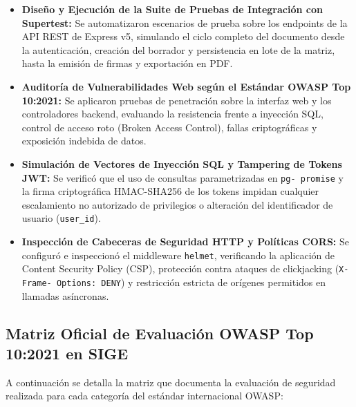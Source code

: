 \documentclass[12pt,a4paper]{article}
\begin{document}
\begin{itemize}[leftmargin=1.5em, itemsep=4pt]
    \item \textbf{Diseño y Ejecución de la Suite de Pruebas de Integración con Supertest:} Se automatizaron escenarios de prueba sobre los endpoints de la API REST de Express v5, simulando el ciclo completo del documento desde la autenticación, creación del borrador y persistencia en lote de la matriz, hasta la emisión de firmas y exportación en PDF.
    \item \textbf{Auditoría de Vulnerabilidades Web según el Estándar OWASP Top 10:2021:} Se aplicaron pruebas de penetración sobre la interfaz web y los controladores backend, evaluando la resistencia frente a inyección SQL, control de acceso roto (Broken Access Control), fallas criptográficas y exposición indebida de datos.
    \item \textbf{Simulación de Vectores de Inyección SQL y Tampering de Tokens JWT:} Se verificó que el uso de consultas parametrizadas en \texttt{pg- promise} y la firma criptográfica HMAC-SHA256 de los tokens impidan cualquier escalamiento no autorizado de privilegios o alteración del identificador de usuario (\texttt{user\_\allowbreak  id}).
    \item \textbf{Inspección de Cabeceras de Seguridad HTTP y Políticas CORS:} Se configuró e inspeccionó el middleware \texttt{helmet}, verificando la aplicación de Content Security Policy (CSP), protección contra ataques de clickjacking (\texttt{X- Frame- Options: DENY}) y restricción estricta de orígenes permitidos en llamadas asíncronas.
\end{itemize}

\subsection{Matriz Oficial de Evaluación OWASP Top 10:2021 en SIGE}
A continuación se detalla la matriz que documenta la evaluación de seguridad realizada para cada categoría del estándar internacional OWASP:
\end{document}
